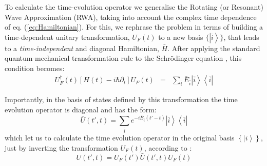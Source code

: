 \documentclass[pra,twocolumn,showkeys,preprintnumbers, amsmath,amssymb, aps,A4paper]{revtex4-1}
\begin{document}
To calculate the time-evolution operator we generalise the Rotating (or Resonant) Wave Approximation (RWA), taking into account the complex time dependence of eq. (\ref{eq:Hamiltonian}). For this, we rephrase the problem in terms of building a time-dependent unitary transformation, $U_F(t)$ to a new basis $\{\left| \bar{i} \right\rangle\}$, that leads to a \textit{time-independent} and diagonal Hamiltonian, $\bar{H}$. After applying the standard quantum-mechanical transformation rule to the Schr\"{o}dinger equation \cite{chu1985recent,PhysRevA.81.063626}, this condition becomes:
\begin{eqnarray}
 U_F^\dagger(t) \left[ H(t) - i \hbar \partial_t \right] U_F(t)  &=& \sum_{\bar{i}} \bar{E}_{\bar{i}} \left| \bar{i} \right\rangle \left\langle \bar{i} \right|
\label{eq:Hdressed}
\end{eqnarray}

Importantly, in the basis of states defined by this transformation the time evolution operator is diagonal and has the form:
\begin{equation}
\bar{U}(t',t) = \sum_{\bar{i}} e^{-i \bar{E}_{\bar{i}} (t'-t)} \left| \bar{i} \right\rangle \left\langle \bar{i} \right|
\label{eq:dressedtimeevolution}
\end{equation}
which let us to calculate the time evolution operator in the original basis $\left\{ \left| i\right\rangle\right\}$, just by inverting the transformation $U_F(t)$, according to \cite{PhysRevA.81.063626}:
\begin{equation}
U(t',t) = U_F(t') \bar{U}(t',t) U_F(t)
\label{eq:baretimeevolution}
\end{equation}
\end{document}
